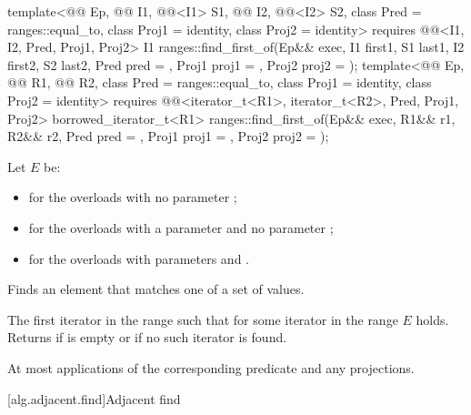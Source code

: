 \begin{itemdecl}
template<@@ Ep, @@ I1, @@<I1> S1,
         @@ I2, @@<I2> S2,
         class Pred = ranges::equal_to, class Proj1 = identity, class Proj2 = identity>
  requires @@<I1, I2, Pred, Proj1, Proj2>
  I1 ranges::find_first_of(Ep&& exec, I1 first1, S1 last1, I2 first2, S2 last2, Pred pred = {},
                           Proj1 proj1 = {}, Proj2 proj2 = {});
template<@@ Ep, @@ R1, @@ R2,
         class Pred = ranges::equal_to, class Proj1 = identity, class Proj2 = identity>
  requires @@<iterator_t<R1>, iterator_t<R2>, Pred, Proj1, Proj2>
  borrowed_iterator_t<R1>
    ranges::find_first_of(Ep&& exec, R1&& r1, R2&& r2, Pred pred = {},
                          Proj1 proj1 = {}, Proj2 proj2 = {});
\end{itemdecl}

\begin{itemdescr}
\pnum
Let $E$ be:
\begin{itemize}
\item {} for the overloads with no parameter ;
\item {} for the overloads with a parameter  and no parameter ;
\item {} for the overloads with parameters  and .
\end{itemize}

\pnum
\effects
Finds an element that matches one of a set of values.

\pnum
\returns
The first iterator  in the range 
such that for some iterator  in the range 
$E$ holds.
Returns 
if  is empty or
if no such iterator is found.

\pnum
\complexity
At most  applications
of the corresponding predicate and any projections.
\end{itemdescr}

[alg.adjacent.find]{Adjacent find}

